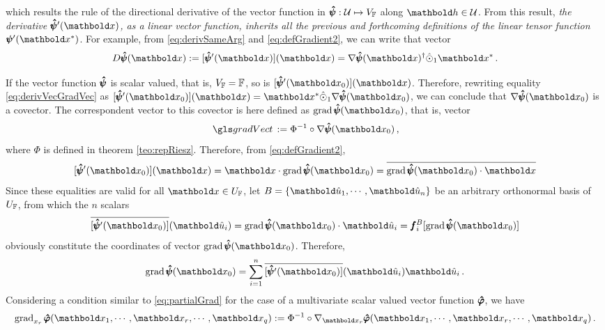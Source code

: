 which results the rule of the directional derivative of the vector function in $\pmb{\hat\psi} : \mathcal{U} \mapsto V_{\mathbb{F}}$ along $\vto{h}\in\mathcal{U}$. From this result, \emph{the derivative $\tnr{\hat\psi}'(\vto{x})$, as a linear vector function, inherits all the previous and forthcoming definitions of the linear tensor function $\fua{\tnr{\psi}'}{\vto{x}^*}$}. For example, from \eqref{eq:derivSameArg} and \eqref{eq:defGradient2}, we can write that vector
\begin{equation}\label{eq:derivSameArg2}
\fua{D\tnr{\hat\psi}}{\vto{x}} := \fua{[\tnr{\hat\psi}'(\vto{x})]}{\vto{x}}=\fua{ \nabla\tnr{\hat{\psi}}}{\vto{x}}^\dagger\hat{\odot}_1\vto{x}^*\,.
\end{equation}


If the vector function $\pmb{\hat\psi}$ is scalar valued, that is, $V_{\mathbb{F}}=\mathbb{F}$, so is $\fua{[\tnr{\hat\psi}'(\vto{x}_0)]}{\vto{x}}$. Therefore, rewriting equality \eqref{eq:derivVecGradVec} as $\fua{[\tnr{\hat\psi}'(\vto{x}_0)]}{\vto{x}} = \vto{x}^*\hat{\odot}_1\fua{ \nabla\tnr{\hat{\psi}}}{\vto{x}_0}$, we can conclude that $\fua{\nabla\tnr{\hat{\psi}}}{\vto{x}_0}$ is a covector. The correspondent vector to this covector is here defined as $\fua{\grad{\tnr{\hat{\psi}}}}{\vto{x}_0}$, that is, vector      
\begin{equation}
\gloref{gradVect}:=\Phi^{-1}\circ\fua{\nabla\tnr{\hat{\psi}}}{\vto{x}_0}\,,
\end{equation}
where $\Phi$ is defined in theorem \ref{teo:repRiesz}. Therefore, from \eqref{eq:defGradient2},
\begin{equation}\label{eq:gradScalVectFunc}
\fua{[\tnr{\hat\psi}'(\vto{x}_0)]}{\vto{x}} = \vto{x}\cdot\fua{\grad{\tnr{\hat{\psi}}}}{\vto{x}_0}=\overline{\fua{\grad{\tnr{\hat{\psi}}}}{\vto{x}_0}\cdot\vto{x}}
\end{equation}
Since these equalities are valid for all $\vto{x}\in U_\cam{F}$, let $B=\{\vun{u}_1,\cdots,\vun{u}_n\}$ be an arbitrary orthonormal basis of $U_{\mathbb{F}}$, from which the $n$ scalars
\begin{equation*}
\fua{\overline{[\tnr{\hat\psi}'(\vto{x}_0)]}}{\vun{u}_i} = \fua{\grad{\tnr{\hat{\psi}}}}{\vto{x}_0}\cdot\vun{u}_i=\vtf{f}_i^{B}[\fua{\grad{\tnr{\hat{\psi}}}}{\vto{x}_0}]
\end{equation*}
obviously constitute the coordinates of vector $\fua{\grad{\tnr{\hat{\psi}}}}{\vto{x}_0}$. Therefore, 
\begin{equation}
\fua{\grad{\tnr{\hat{\psi}}}}{\vto{x}_0} = \sum_{i=1}^n\fua{\overline{[\tnr{\hat\psi}'(\vto{x}_0)]}}{\vun{u}_i}\vun{u}_i\,.
\end{equation}
Considering a condition similar to \eqref{eq:partialGrad} for the case of a multivariate scalar valued vector function $\pmb{\hat{\varphi}}$, we have
\begin{equation}
\fua{\gradp{x_r}{\tnr{\hat{\varphi}}}}{\vto{x}_1,\cdots,\vto{x}_r,\cdots,\vto{x}_q}:=\Phi^{-1}\circ\fua{\nabla_{\vto{x}_r}\tnr{\hat{\varphi}}}{\vto{x}_1,\cdots,\vto{x}_r,\cdots,\vto{x}_q}\,.
\end{equation}

